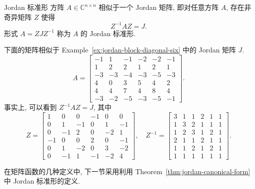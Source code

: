 \begin{Theorem}{{Jordan 标准形}}\label{thm:jordan-canonical-form}
{方阵 $A\in\mathbb{C}^{n\times n}$ 相似于一个 Jordan 矩阵, 即对任意方阵 $A$, 存在非奇异矩阵 $Z$ 使得}
\[Z^{-1}AZ=J.\]
{形式 $A=ZJZ^{-1}$ 称为 $A$ 的 Jordan 标准形.}
\end{Theorem}

\begin{Example}\label{ex:jordan-similarity-six}
{下面的矩阵相似于 Example~\ref{ex:jordan-block-diagonal-six} 中的 Jordan 矩阵 $J$.}
\[
A=\begin{bmatrix}-1&1&-1&-2&-2&-1\\1&2&2&1&2&1\\-3&-3&-4&-3&-5&-3\\4&0&3&5&4&2\\4&4&7&4&8&4\\-3&-2&-5&-3&-5&-1\end{bmatrix}.
\]
{事实上, 可以看到 $Z^{-1}AZ=J$, 其中}
\[
Z=\begin{bmatrix}1&0&0&-1&0&0\\0&1&-1&0&1&-1\\0&-1&2&0&-2&1\\-1&0&0&2&0&-1\\0&1&-2&0&3&-2\\0&-1&1&-1&-2&4\end{bmatrix},\quad
Z^{-1}=\begin{bmatrix}3&1&1&2&1&1\\1&3&2&1&1&1\\1&2&3&1&2&1\\2&1&1&2&1&1\\1&1&2&1&2&1\\1&1&1&1&1&1\end{bmatrix}.
\]
\end{Example}

{在矩阵函数的几种定义中, 下一节采用利用 Theorem~\ref{thm:jordan-canonical-form} 中 Jordan 标准形的定义.}
